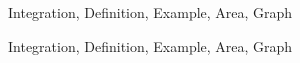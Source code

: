 \begin{tagblock}{Integration, Definition, Example, Area, Graph}
\begin{question}
\begin{enumerate}
\end{enumerate} 


	
	
\begin{tags}
	    Integration, Definition, Example, Area, Graph
\end{tags}
	
\begin{diary}
\end{diary}
	
\begin{solution}
	   
	    \end{enumerate}
\end{solution}
	
\end{question}

\end{tagblock}



